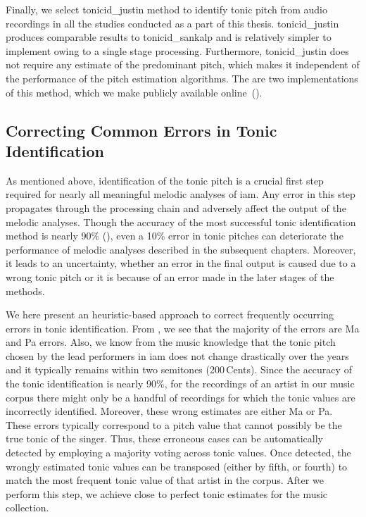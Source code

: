 {Finally, we select \acrshort{tonicid_justin} method to identify tonic pitch from audio recordings in all the studies conducted as a part of this thesis. \acrshort{tonicid_justin} produces comparable results to \acrshort{tonicid_sankalp} and is relatively simpler to implement owing to a single stage processing. Furthermore, \acrshort{tonicid_justin} does not require any estimate of the predominant pitch, which makes it independent of the performance of the pitch estimation algorithms. The are two implementations of this method, which we make publicly available online~().


\subsection{Correcting Common Errors in Tonic Identification}
\label{sec:pre_processing_tonic_identification_correcting_errors}

As mentioned above, identification of the tonic pitch is a crucial first step required for nearly all meaningful melodic analyses of \gls{iam}. Any error in this step propagates through the processing chain and adversely affect the output of the melodic analyses. Though the accuracy of the most successful tonic identification method is nearly 90\% (), even a 10\% error in tonic pitches can deteriorate the performance of melodic analyses described in the subsequent chapters. Moreover, it leads to an uncertainty, whether an error in the final output is caused due to a wrong tonic pitch or it is because of an error made in the later stages of the methods. 

We here present an heuristic-based approach to correct frequently occurring errors in tonic identification. From , we see that the majority of the errors are Ma and Pa errors. Also, we know from the music knowledge that the tonic pitch chosen by the lead performers in \gls{iam} does not change drastically over the years and it typically remains within two semitones (200\,Cents). Since the accuracy of the tonic identification is nearly 90\%, for the recordings of an artist in our music corpus there might only be a handful of recordings for which the tonic values are incorrectly identified. Moreover, these wrong estimates are either Ma or Pa. These errors typically correspond to a pitch value that cannot possibly be the true tonic of the singer. Thus, these erroneous cases can be automatically detected by employing a majority voting across tonic values. Once detected, the wrongly estimated tonic values can be transposed (either by fifth, or fourth) to match the most frequent tonic value of that artist in the corpus. After we perform this step, we achieve close to perfect tonic estimates for the music collection. %


}
